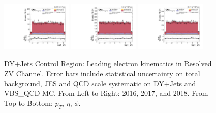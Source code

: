 \begin{figure}[!ht]
  \includegraphics[width=0.30\textwidth]{analysis_plots/2016_zjj/cr_vjets_e/lep1_phi.pdf}
  \includegraphics[width=0.30\textwidth]{analysis_plots/2017_zjj/cr_vjets_e/lep1_phi.pdf}
  \includegraphics[width=0.30\textwidth]{analysis_plots/2018_zjj/cr_vjets_e/lep1_phi.pdf} \\
  \caption[DY+Jets Control Region: Leading electron kinematics in Resolved ZV Channel]%
  {DY+Jets Control Region: Leading electron kinematics in Resolved ZV Channel.
    Error bars include statistical uncertainty on total background,
    JES and QCD scale systematic on DY+Jets and VBS\_QCD MC\@. From Left to Right: 2016,
    2017, and 2018. From Top to Bottom: \( p_T \), \( \eta \), \( \phi \).}%
  \label{fig:zjj-cr-vjets-e-lep1-pt-eta-phi}
\end{figure}

